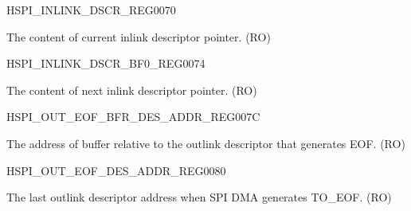 \begin{register}{H}{SPI\_INLINK\_DSCR\_REG}{\hexprefix{}0070}\label{regdesc:SPIINLINKDSCRREG}
%
\regnewline%
\begin{regdesc}\begin{reglist}
\label{fielddesc:SPIDMAINLINKDSCR}\item [SPI\_DMA\_INLINK\_DSCR] The content of current inlink descriptor pointer. (RO)
\end{reglist}\end{regdesc}
\end{register}


\begin{register}{H}{SPI\_INLINK\_DSCR\_BF0\_REG}{\hexprefix{}0074}\label{regdesc:SPIINLINKDSCRBF0REG}
%
\regnewline%
\begin{regdesc}\begin{reglist}
\label{fielddesc:SPIDMAINLINKDSCRBF0}\item [SPI\_DMA\_INLINK\_DSCR\_BF0] The content of next inlink descriptor pointer. (RO)
\end{reglist}\end{regdesc}
\end{register}


\begin{register}{H}{SPI\_OUT\_EOF\_BFR\_DES\_ADDR\_REG}{\hexprefix{}007C}\label{regdesc:SPIOUTEOFBFRDESADDRREG}
%
\regnewline%
\begin{regdesc}\begin{reglist}
\label{fielddesc:SPIDMAOUTEOFBFRDESADDR}\item [SPI\_DMA\_OUT\_EOF\_BFR\_DES\_ADDR] The address of buffer relative to the outlink descriptor that generates EOF. (RO)
\end{reglist}\end{regdesc}
\end{register}


\begin{register}{H}{SPI\_OUT\_EOF\_DES\_ADDR\_REG}{\hexprefix{}0080}\label{regdesc:SPIOUTEOFDESADDRREG}
%
\regnewline%
\begin{regdesc}\begin{reglist}
\label{fielddesc:SPIDMAOUTEOFDESADDR}\item [SPI\_DMA\_OUT\_EOF\_DES\_ADDR] The last outlink descriptor address when SPI DMA generates TO\_EOF. (RO)
\end{reglist}\end{regdesc}
\end{register}


